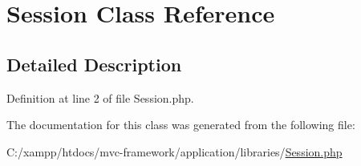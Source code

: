 \hypertarget{class_session}{}\section{Session Class Reference}
\label{class_session}


\subsection{Detailed Description}


Definition at line 2 of file Session.\+php.



The documentation for this class was generated from the following file\+:\begin{DoxyCompactItemize}
\item 
C\+:/xampp/htdocs/mvc-\/framework/application/libraries/\hyperlink{_session_8php}{Session.\+php}\end{DoxyCompactItemize}
